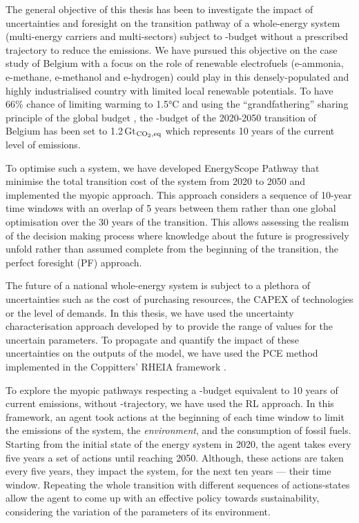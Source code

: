 

The general objective of this thesis has been to investigate the impact of uncertainties and foresight on the transition pathway of a whole-energy system (\ie multi-energy carriers and multi-sectors) subject to -budget without a prescribed trajectory to reduce the emissions.  We have pursued this objective on the case study of Belgium with a focus on the role of renewable electrofuels (\ie e-ammonia, e-methane, e-methanol and e-hydrogen) could play in this densely-populated and highly industrialised country with limited local renewable potentials. To have 66\% chance of limiting warming to 1.5°C \cite{IPCC_CO2_budget} and using the ``grandfathering'' sharing principle of the global budget \cite{knight2013grandfathering}, the -budget of the 2020-2050 transition of Belgium has been set to 1.2\,Gt$_{\ce{CO2},\text{eq}}$ which represents 10 years of the current level of emissions.

To optimise such a system, we have developed EnergyScope Pathway that minimise the total transition cost of the system from 2020 to 2050 and implemented the myopic approach. This approach considers a sequence of 10-year time windows with an overlap of 5 years between them rather than one global optimisation over the 30 years of the transition. This allows assessing the realism of the decision making process where knowledge about the future is progressively unfold rather than assumed complete from the beginning of the transition, the perfect foresight (PF) approach. 

The future of a national whole-energy system is subject to a plethora of uncertainties such as the cost of purchasing resources, the \acrfull{CAPEX} of technologies or the level of demands. In this thesis, we have used the uncertainty characterisation approach developed by \citet{moret2016strategic} to provide the range of values for the uncertain parameters. To propagate and quantify the impact of these uncertainties on the outputs of the model, we have used the \acrfull{PCE} method implemented in the Coppitters' RHEIA framework \cite{coppittersthesis}.

To explore the myopic pathways respecting a -budget equivalent to 10 years of current emissions, without -trajectory, we have used the \acrfull{RL} approach. In this framework, an agent took actions at the beginning of each time window to limit the emissions of the system, the \textit{environment}, and the consumption of fossil fuels. Starting from the initial state of the energy system in 2020, the agent takes every five years a set of actions until reaching 2050. Although, these actions are taken every five years, they impact the system, for the next ten years --- their time window. Repeating the whole transition with different sequences of actions-states allow the agent to come up with an effective policy towards sustainability, considering the variation of the parameters of its environment.

